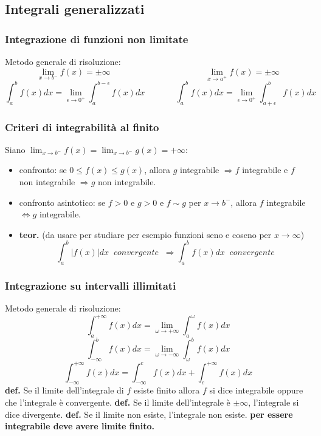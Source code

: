\subsection{Integrali generalizzati}
\subsubsection{Integrazione di funzioni non limitate}
Metodo generale di risoluzione:
\[
    \lim_{x\rightarrow b^-} f(x) = \pm \infty \;\;\;\;\;\;\;\;\;\;\;\;\;\;\;\;\;\;\;\;\;\;\;\;\;\;\;\;\;\;\;\;\;\;\;\;\;\;\;\;\lim_{x\rightarrow a^+}f(x) = \pm \infty
\]
\[
    \int_{a}^{b}f(x)dx = \lim_{\epsilon\rightarrow 0^+}\int_{a}^{b-\epsilon}f(x)dx \;\;\;\;\;\;\;\;\;\;\;\;\; \int_{a}^{b}f(x)dx = \lim_{\epsilon\rightarrow 0^+}\int_{a+\epsilon}^{b}f(x)dx 
\]
\subsubsection{Criteri di integrabilità al finito}
Siano $\lim_{x\rightarrow b^-}f(x) = \lim_{x\rightarrow b^-}g(x) = + \infty$:
\begin{itemize}
    \item confronto: se $0\leq f(x) \leq g(x)$, allora $g$ integrabile $\Rightarrow f$ integrabile e $f$ non integrabile $\Rightarrow g$ non integrabile.
    \item confronto asintotico: se $f>0$ e $g>0$ e $f \sim g$ per $x \rightarrow b^-$, allora $f$ integrabile $\Leftrightarrow g$ integrabile.
    \item \textbf{teor.} (da usare per studiare per esempio funzioni seno e coseno per $x \rightarrow \infty$)
    \[
        \int_{a}^{b}|f(x)|dx \;\; convergente \;\;\Rightarrow \int_{a}^{b}f(x)dx \;\;convergente
    \]
\end{itemize}
\subsubsection{Integrazione su intervalli illimitati}
Metodo generale di risoluzione:
\[
    \int_{a}^{+\infty}f(x) dx = \lim_{\omega\rightarrow +\infty}\int_{a}^{\omega}f(x)dx
\]
\[
    \int_{- \infty}^{b}f(x) dx = \lim_{\omega\rightarrow -\infty}\int_{\omega}^{b}f(x)dx
\]
\[
    \int_{-\infty}^{+\infty}f(x) dx = \int_{-\infty}^{c} f(x) dx + \int_{c}^{+\infty}f(x) dx
\]
\textbf{def.} Se il limite dell'integrale di $f$ esiste finito allora $f$ si dice integrabile oppure che l'integrale è convergente. \newline
\textbf{def.} Se il limite dell'integrale è $\pm \infty$, l'integrale si dice divergente.\newline
\textbf{def.} Se il limite non esiste, l'integrale non esiste.\newline
\textbf{per essere integrabile deve avere limite finito.}
